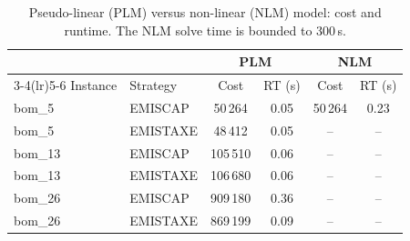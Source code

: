 \begin{table}[!htbp]\centering\small
\caption{Pseudo-linear (PLM) versus non-linear (NLM) model: cost and runtime. The NLM solve time is bounded to 300\,s.}\label{tab:plmnlm}
\begin{tabular}{llcccc}
\toprule
 & & \multicolumn{2}{c}{PLM} & \multicolumn{2}{c}{NLM}\\
\cmidrule(lr){3-4}\cmidrule(lr){5-6}
Instance & Strategy & Cost & RT (s) & Cost & RT (s)\\
\midrule
bom\_5 & EMISCAP & 50\,264 & 0.05 & 50\,264 & 0.23 \\
bom\_5 & EMISTAXE & 48\,412 & 0.05 & -- & -- \\
bom\_13 & EMISCAP & 105\,510 & 0.06 & -- & -- \\
bom\_13 & EMISTAXE & 106\,680 & 0.06 & -- & -- \\
bom\_26 & EMISCAP & 909\,180 & 0.36 & -- & -- \\
bom\_26 & EMISTAXE & 869\,199 & 0.09 & -- & -- \\
\bottomrule
\end{tabular}
\end{table}
